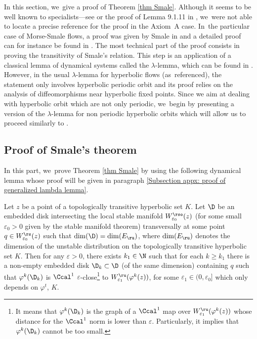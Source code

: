 \begin{appendix}
\label{Appendix: proof of Smale ordering}
In this section, we~give a proof of Theorem \ref{thm Smale}. Although it seems to be well known to specialists---see \cite[p.\,158]{robinson} or the proof of Lemma 9.1.11 in \cite[p.\,536]{FH}, we~were not able to locate a precise reference for the proof in the Axiom~A case. In~the particular case of Morse-Smale flows, a proof was given by Smale in \cite{smale-morse} and a detailed proof can for instance be found in \cite[App.\,B]{DRI}. The most technical part of the proof consists in proving the transitivity of Smale's relation. This step is an application of a classical lemma of dynamical systems called the $\lambda$-lemma, which can be found in \cite[Prop.\,6.1.10, p.\,335]{FH}. However, in the usual $\lambda$-lemma for hyperbolic flows (as~referenced), the statement only involves hyperbolic periodic orbit and its proof relies on the analysis of diffeomorphisms near hyperbolic fixed points. Since we aim at dealing with hyperbolic orbit which are not only periodic, we~begin by presenting a version of the $\lambda$-lemma for non periodic hyperbolic orbits which will allow us to proceed similarly to \cite[App.\,B]{DRI}.

\subsection{Proof of Smale's theorem}

In this part, we~prove Theorem \ref{thm Smale} by using the following dynamical lemma whose proof will be given in paragraph \ref{Subsection appx: proof of generalized lambda lemma}.

\begin{prop}\label{Prop: lambda lemma for non periodic orbit} Let $z$ be a point of a topologically transitive hyperbolic set $K$. Let $\D$ be an embedded disk intersecting the local stable manifold $W_{\varepsilon_0}^{\rso} (z)$ (for some small $\varepsilon_0 > 0$ given by the stable manifold theorem) transversally at some point $q \in W_{\varepsilon_0}^\rs (z)$ such that $\dim (\D) = \dim(E_\ru)$, where $\dim (E_\ru)$ denotes the dimension of the unstable distribution on the topologically transitive hyperbolic set $K$. Then for any $\varepsilon > 0$, there exists $k_1 \in \N$ such that
for each $k \geq k_1$ there is a non-empty embedded disk $\D_k \subset \D$ (of the same dimension) containing $q$ such that $\varphi^k (\D_k)$ is $\Ccal^1$ $\varepsilon$-close\footnote{It means that $\varphi^k (\D_k)$ is the graph of a $\Ccal^1$ map over $W_{\varepsilon_1}^{\ru} (\varphi^k(z))$ whose distance for the $\Ccal^1$ norm is lower than $\varepsilon$. Particularly, it implies that $\varphi^k (\D_k)$ cannot be too small.} to $W_{\varepsilon_1}^{\ru} (\varphi^k(z))$, for some $\varepsilon_1\in(0,\varepsilon_0]$ which only depends on $\varphi^t$, $K$.
\end{prop}


\end{appendix}
